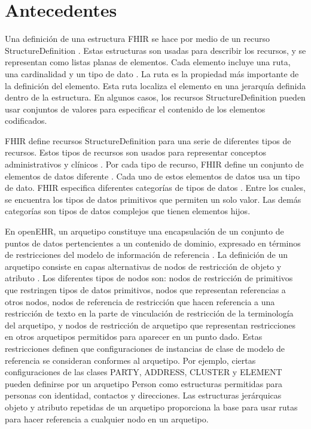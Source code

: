 \section{Antecedentes}

Una definición de una estructura FHIR se hace por medio de un recurso StructureDefinition \cite{FHIRStructureDefinition}. Estas estructuras son usadas para describir los recursos, y se representan como listas planas de elementos. Cada elemento incluye una ruta, una cardinalidad y un tipo de dato \cite{FHIRElementDefinition}. La ruta es la propiedad más importante de la definición del elemento. Esta ruta localiza el elemento en una jerarquía definida dentro de la estructura. En algunos casos, los recursos StructureDefinition pueden usar conjuntos de valores para especificar el contenido de los elementos codificados.

FHIR define recursos StructureDefinition para una serie de diferentes tipos de recursos. Estos tipos de recursos son usados para representar conceptos administrativos y clínicos \cite{FHIRResourceList}. Por cada tipo de recurso, FHIR define un conjunto de elementos de datos diferente \cite{FHIRResource}. Cada uno de estos elementos de datos usa un tipo de dato. FHIR especifica diferentes categorías de tipos de datos \cite{FHIRDataTypes}. Entre los cuales, se encuentra los tipos de datos primitivos que permiten un solo valor. Las demás categorías son tipos de datos complejos que tienen elementos hijos.

En openEHR, un arquetipo constituye una encapsulación de un conjunto de puntos de datos pertencientes a un contenido de dominio, expresado en términos de restricciones del modelo de información de referencia \cite{openEHRArchetype}. La definición de un arquetipo consiste en capas alternativas de nodos de restricción de objeto y atributo \cite{openEHRAOM}. Los diferentes tipos de nodos son: nodos de restricción de primitivos que restringen tipos de datos primitivos, nodos que representan referencias a otros nodos, nodos de referencia de restricción que hacen referencia a una restricción de texto en la parte de vinculación de restricción de la terminología del arquetipo, y nodos de restricción de arquetipo que representan restricciones en otros arquetipos permitidos para aparecer en un punto dado. Estas restricciones definen que configuraciones de instancias de clase de modelo de referencia se consideran conformes al arquetipo. Por ejemplo, ciertas configuraciones de las clases PARTY, ADDRESS, CLUSTER y ELEMENT pueden definirse por un arquetipo Person como estructuras permitidas para personas con identidad, contactos y direcciones. Las estructuras jerárquicas objeto y atributo repetidas de un arquetipo proporciona la base para usar rutas para hacer referencia a cualquier nodo en un arquetipo.

